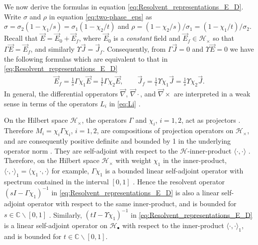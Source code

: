 \documentclass{cmslatex}
\begin{document}
We now derive the formulas in equation
\eqref{eq:Resolvent_representations_E_D}.
Write $\sigma$ and $\rho$ in 
equation \eqref{eq:two-phase_eps} as $\sigma=\sigma_2(1-\chi_1/s)=\sigma_1(1-\chi_2/t)$ and
$\rho=(1-\chi_2/s)/\sigma_1=(1-\chi_1/t)/\sigma_2$. Recall that
$\vec{E}=\vec{E}_0+\vec{E}_f$, where $\vec{E}_0$ is a \emph{constant}
field and $\vec{E}_f\in\mathscr{H}_\times$ so that
$\Gamma\vec{E}=\vec{E}_f$, and similarly
$\Upsilon\vec{J}=\vec{J}_f$. Consequently, from $\Gamma\vec{J}=0$ and $\Upsilon\vec{E}=0$
we have the following formulas which are equivalent to that in 
\eqref{eq:Resolvent_representations_E_D}  
% 
\begin{align}\label{eq:Proj_rep_Ef_Jf}
  \vec{E}_f=\frac{1}{s}\Gamma\chi_1\vec{E}=\frac{1}{t}\Gamma\chi_2\vec{E}, \qquad
  \vec{J}_f=\frac{1}{t}\Upsilon\chi_1\vec{J}=\frac{1}{s}\Upsilon\chi_2\vec{J}.
\end{align}
%
In general, the differential opperators $\vec{\nabla}$, $\vec{\nabla}\cdot$, and
$\vec{\nabla}\times$ are interpreted
in a weak sense in terms of the operators $L_i$ in \eqref{eq:Li}
\cite{Golden:CMP-473}. 



On the Hilbert space $\mathscr{H}_\times$, the operators $\Gamma$ and $\chi_i$,
$i=1,2$, act as projectors \cite{Golden:CMP-473}. Therefore 
$M_i=\chi_i\Gamma\chi_i$, $i=1,2$, are compositions of projection operators on
$\mathscr{H}_\times$, and are consequently positive definite and bounded by
1 in the underlying operator norm \cite{Rudin:87}. They are
self-adjoint with respect to the $\mathscr{H}$-inner-product $\langle\cdot,\cdot\rangle$
\cite{Golden:CMP-473}. Therefore, on the Hilbert space $\mathscr{H}_\times$
with weight $\chi_1$ in the inner-product, $\langle\cdot,\cdot\rangle_1=\langle\chi_1\,\cdot,\cdot\rangle$ for
example, $\Gamma\chi_1$ is a bounded linear self-adjoint operator with
spectrum contained in the interval $[0,1]$
\cite{Golden:CMP-473,Folland:95,Rudin:87}. Hence the resolvent
operator $(sI-\Gamma\chi_1)^{-1}$ in \eqref{eq:Resolvent_representations_E_D}
is also a linear self-adjoint operator with respect to the same
inner-product, and is bounded for  $s\in\mathbb{C}\backslash[0,1]$
\cite{Stone:64}. Similarly, $(tI-\Upsilon\chi_1)^{-1}$ in
\eqref{eq:Resolvent_representations_E_D} is a linear self-adjoint
operator on $\mathscr{H}_\bullet$ with respect to the inner-product
$\langle\cdot,\cdot\rangle_1$, and is bounded for $t\in\mathbb{C}\backslash[0,1]$.
\end{document}
